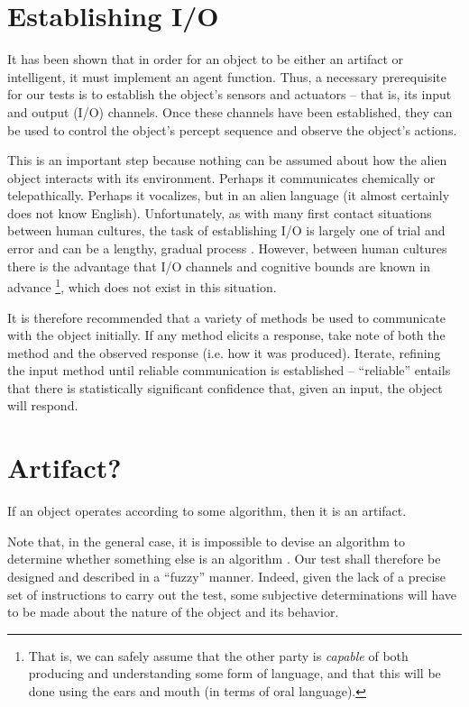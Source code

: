 \documentclass[12pt,letterpaper]{article}
\begin{document}
\section*{Establishing I/O}

It has been shown that in order for an object to be either an artifact or intelligent, it must implement an agent function. Thus, a necessary prerequisite for our tests is to establish the object's sensors and actuators -- that is, its input and output (I/O) channels. Once these channels have been established, they can be used to control the object's percept sequence and observe the object's actions.

This is an important step because nothing can be assumed about how the alien object interacts with its environment. Perhaps it communicates chemically or telepathically. Perhaps it vocalizes, but in an alien language (it almost certainly does not know English). Unfortunately, as with many first contact situations between human cultures, the task of establishing I/O is largely one of trial and error and can be a lengthy, gradual process \cite{Ivir:1991}. However, between human cultures there is the advantage that I/O channels and cognitive bounds are known in advance \footnote{That is, we can safely assume that the other party is \emph{capable} of both producing and understanding some form of language, and that this will be done using the ears and mouth (in terms of oral language).}, which does not exist in this situation.

It is therefore recommended that a variety of methods be used to communicate with the object initially. If any method elicits a response, take note of both the method and the observed response (i.e. how it was produced). Iterate, refining the input method until reliable communication is established -- ``reliable'' entails that there is statistically significant confidence that, given an input, the object will respond.

\section*{Artifact?}

If an object operates according to some algorithm, then it is an artifact.

Note that, in the general case, it is impossible to devise an algorithm to determine whether something else is an algorithm \cite{Weiss:2008}. Our test shall therefore be designed and described in a ``fuzzy'' manner. Indeed, given the lack of a precise set of instructions to carry out the test, some subjective determinations will have to be made about the nature of the object and its behavior.
\end{document}
